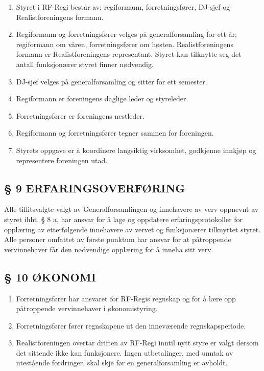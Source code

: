 \documentclass[a4paper,11pt,norsk]{scrartcl}
\begin{document}
\begin{enumerate}
\renewcommand{\labelenumi}{\alph{enumi})}
\item Styret i RF-Regi består av: regiformann, forretningsfører, DJ-sjef og
Realistforeningens formann.

\item Regiformann og forretningsfører velges på generalforsamling for ett
år; regiformann om våren, forretningsfører om høsten. Realistforeningens formann er Realistforeningens representant. Styret kan tilknytte seg det antall funksjonærer styret finner nødvendig.

\item DJ-sjef velges på generalforsamling og sitter for ett semester.

\item Regiformann er foreningens daglige leder og styreleder.

\item Forretningsfører er foreningens nestleder.

\item Regiformann og forretningsfører tegner sammen for foreningen.

\item Styrets oppgave er å koordinere langsiktig virksomhet, godkjenne innkjøp
og representere foreningen utad.
\end{enumerate}


\subsection{§ 9 ERFARINGSOVERFØRING%
  \label{erfaringsoverforing}%
}

Alle tillitsvalgte valgt av
Generalforsamlingen og innehavere av verv oppnevnt av styret
ihht. § 8 a, har ansvar for å lage og oppdatere erfaringsprotokoller
for opplæring av etterfølgende innehavere av vervet og funksjonærer
tilknyttet styret. Alle personer omfattet av første punktum
har ansvar for at påtroppende vervinnehaver får den nødvendige
opplæring for å inneha sitt verv.


\subsection{§ 10 ØKONOMI%
  \label{okonomi}%
}

\begin{enumerate}
\renewcommand{\labelenumi}{\alph{enumi})}
\item Forretningsfører har ansvaret for RF-Regis regnskap og for
å lære opp påtroppende vervinnehaver i økonomistyring.

\item Forretningsfører fører regnskapene ut den inneværende regnskapsperiode.

\item Realistforeningen overtar driften av RF-Regi inntil nytt
styre er valgt dersom det sittende ikke kan funksjonere. Ingen
utbetalinger, med unntak av utestående fordringer, skal skje før en
generalforsamling er avholdt.
\end{enumerate}
\end{document}
